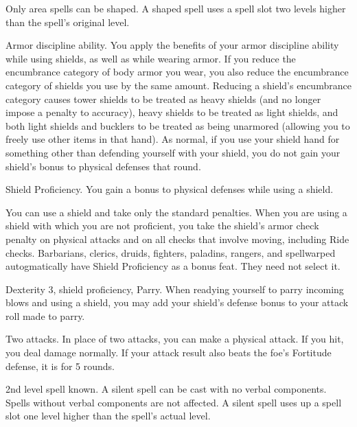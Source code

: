 Only area spells can be shaped.
A shaped spell uses a spell slot two levels higher than the spell's original level.

\featpre Armor discipline ability.
\featben You apply the benefits of your armor discipline ability while using shields, as well as while wearing armor.
If you reduce the encumbrance category of body armor you wear, you also reduce the encumbrance category of shields you use by the same amount.
Reducing a shield's encumbrance category causes tower shields to be treated as heavy shields (and no longer impose a  penalty to accuracy), heavy shields to be treated as light shields, and both light shields and bucklers to be treated as being unarmored (allowing you to freely use other items in that hand).
As normal, if you use your shield hand for something other than defending yourself with your shield, you do not gain your shield's bonus to physical defenses that round.

\featpre Shield Proficiency.
\featben You gain a  bonus to physical defenses while using a shield.

\featben You can use a shield and take only the standard penalties.
When you are using a shield with which you are not proficient, you take the shield's armor check penalty on physical attacks and on all checks that involve moving, including Ride checks.
Barbarians, clerics, druids, fighters, paladins, rangers, and spellwarped autogmatically have Shield Proficiency as a bonus feat.
They need not select it.

\featpres Dexterity 3, shield proficiency, Parry.
\featben When readying yourself to parry incoming blows and using a shield, you may add your shield's defense bonus to your attack roll made to parry.

\featpre Two attacks.
\featben In place of two attacks, you can make a physical attack.
If you hit, you deal damage normally.
If your attack result also beats the foe's Fortitude defense, it is \staggered for 5 rounds.

\featpre 2nd level spell known.
\featben A silent spell can be cast with no verbal components.
Spells without verbal components are not affected.
A silent spell uses up a spell slot one level higher than the spell's actual level.

